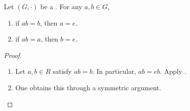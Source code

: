 \begin{corollary} \label{corollary:cancellation_law_for_identity_element_of_group_operation}
    Let $(G,\cdot)$ be a . For any $a,b \in G$,
    \begin{enumerate}
        \item if $ab = b$, then $a = e$.
        \item if $ab = a$, then $b = e$.
    \end{enumerate}
\end{corollary}
\begin{proof}
    \begin{enumerate}
        \item Let $a,b \in R$ satisfy $ab = b$. In particular, $ab = eb$. Apply .

        \item One obtains this through a symmetric argument.
    \end{enumerate}
\end{proof}

